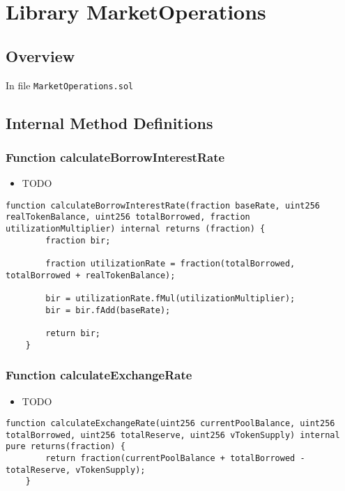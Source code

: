
\chapter{Library MarketOperations}

\minitoc

\section{Overview}


In file {\tt MarketOperations.sol}

\section{Internal Method Definitions}


\subsection{Function calculateBorrowInterestRate}

\noindent\begin{itemize}
\item TODO
\end{itemize}

\begin{lstlisting}[firstnumber=13]
    function calculateBorrowInterestRate(fraction baseRate, uint256 realTokenBalance, uint256 totalBorrowed, fraction utilizationMultiplier) internal returns (fraction) {
        fraction bir;

        fraction utilizationRate = fraction(totalBorrowed, totalBorrowed + realTokenBalance);

        bir = utilizationRate.fMul(utilizationMultiplier);
        bir = bir.fAdd(baseRate);

        return bir;
    }
\end{lstlisting}

\subsection{Function calculateExchangeRate}

\noindent\begin{itemize}
\item TODO
\end{itemize}

\begin{lstlisting}[firstnumber=24]
    function calculateExchangeRate(uint256 currentPoolBalance, uint256 totalBorrowed, uint256 totalReserve, uint256 vTokenSupply) internal pure returns(fraction) {
        return fraction(currentPoolBalance + totalBorrowed - totalReserve, vTokenSupply);
    }
\end{lstlisting}

